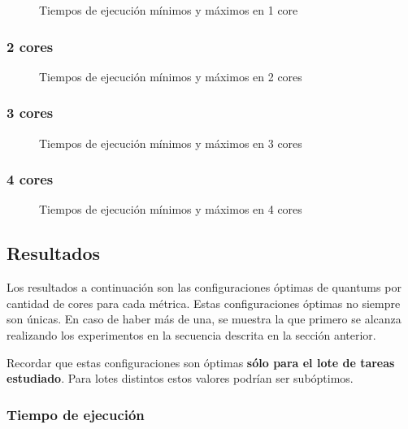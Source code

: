 \documentclass[a4paper,10pt,twoside]{article}
\begin{document}
\begin{figure}[H]
	\centering
	
	\caption{Tiempos de ejecución mínimos y máximos en 1 core}
\end{figure}


\subsubsection{2 cores}

\begin{figure}[H]
	\centering
	
	\caption{Tiempos de ejecución mínimos y máximos en 2 cores}
\end{figure}


\subsubsection{3 cores}

\begin{figure}[H]
	\centering
	
	\caption{Tiempos de ejecución mínimos y máximos en 3 cores}
\end{figure}


\subsubsection{4 cores}

\begin{figure}[H]
	\centering
	
	\caption{Tiempos de ejecución mínimos y máximos en 4 cores}
\end{figure}


\subsection{Resultados}

Los resultados a continuación son las configuraciones óptimas de quantums por cantidad de cores para cada métrica. Estas configuraciones óptimas no siempre son únicas. En caso de haber más de una, se muestra la que primero se alcanza realizando los experimentos en la secuencia descrita en la sección anterior.

Recordar que estas configuraciones son óptimas \textbf{sólo para el lote de tareas estudiado}. Para lotes distintos estos valores podrían ser subóptimos.


\subsubsection{Tiempo de ejecución}
\end{document}
